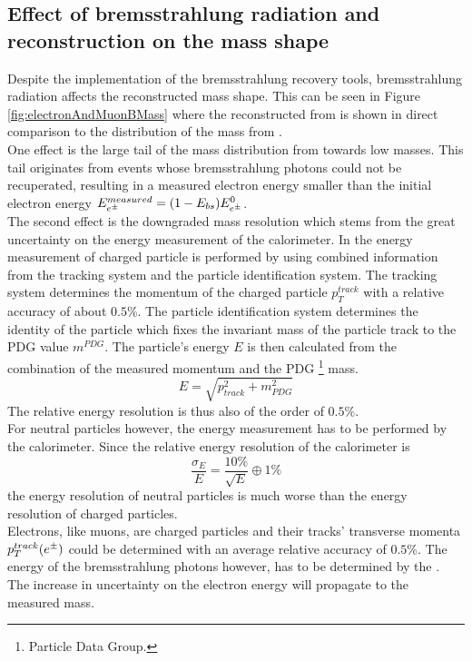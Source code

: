 \subsection{Effect of bremsstrahlung radiation and reconstruction on the \Bd mass shape}
Despite the implementation of the bremsstrahlung recovery tools, bremsstrahlung radiation affects the reconstructed \Bd mass shape. This can be seen in Figure \ref{fig:electronAndMuonBMass} where the reconstructed \Bd from \BdKstee is shown in direct comparison to the distribution of the \Bd mass from \BdKstmumu.\\
One effect is the large tail of the \Bd mass distribution from \BdKstee towards low \Bd masses. This tail originates from events whose bremsstrahlung photons could not be recuperated, resulting in a 
measured electron energy smaller than the initial electron energy $E^{measured}_{e^\pm} = (1 - E_{bs}) E^0_{e^\pm}$. \\
The second effect is the downgraded mass resolution which stems from the great uncertainty on the energy measurement of the calorimeter. In \lhcb the energy measurement of charged particle is performed by using combined information from the tracking system and the particle identification system. The tracking system determines the momentum of the charged particle $p_T^{track}$ with a relative accuracy of about $0.5 $\%. The particle identification system determines the identity of the particle which fixes the invariant mass of the particle track to the PDG value $m^{PDG}$. The particle's energy $E$ is then calculated from the combination of the measured momentum and the PDG \cite{pdg} \footnote{Particle Data Group.} mass.
\begin{equation}
E = \sqrt{p^2_{track} + m^2_{PDG}}
\end{equation}
The relative energy resolution is thus also of the order of $0.5 $\%.\\
For neutral particles however, the energy measurement has to be performed by the calorimeter. Since the relative energy resolution of the calorimeter is  
\begin{equation}
\frac{\sigma_E}{E} = \frac{10 \%}{\sqrt{E}} \oplus 1 \%
\end{equation}
the energy resolution of neutral particles is much worse than the energy resolution of charged particles.\\
Electrons, like muons, are charged particles and their tracks' transverse momenta $p_T^{track}(e^\pm)$ could be determined with an average relative accuracy of $0.5$\%. The energy of the bremsstrahlung photons however, has to be determined by the \ecal. The increase in uncertainty on the electron energy will propagate to the measured \Bd mass. \\
